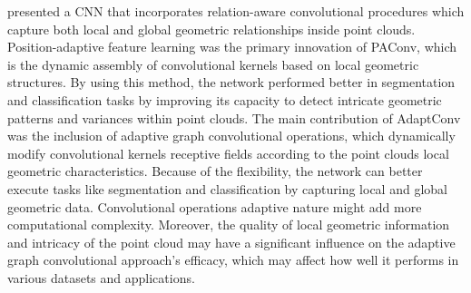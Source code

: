 \cite{liu2019relation} presented a \ac{CNN} that incorporates relation-aware convolutional procedures which capture both local and global geometric relationships inside point clouds. Position-adaptive feature learning was the primary innovation of PAConv\cite{xu2021paconv}, which is the dynamic assembly of convolutional kernels based on local geometric structures. By using this method, the network performed better in segmentation and classification tasks by improving its capacity to detect intricate geometric patterns and variances within point clouds. The main contribution of AdaptConv \cite{zhou2021adaptive} was the inclusion of adaptive graph convolutional operations, which dynamically modify convolutional kernels receptive fields according to the point clouds local geometric characteristics. Because of the flexibility, the network can better execute tasks like segmentation and classification by capturing local and global geometric data. Convolutional operations adaptive nature might add more computational complexity. Moreover, the quality of local geometric information and intricacy of the point cloud may have a significant influence on the adaptive graph convolutional approach's efficacy, which may affect how well it performs in various datasets and applications. 

\vspace{5mm}

